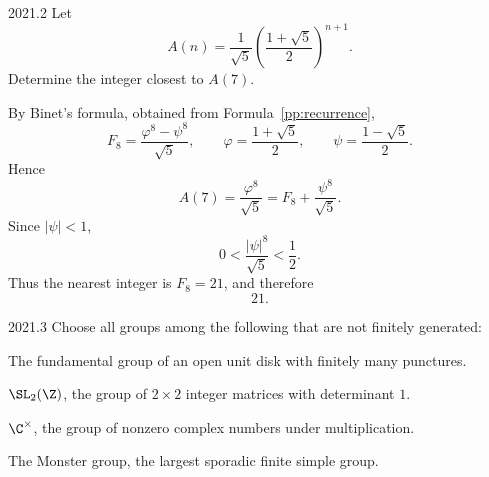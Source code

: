     \begin{pastproblem}{2021.2}
        Let
        \[
            A(n)
            =
            \frac{1}{\sqrt5}
            \left(\frac{1+\sqrt5}{2}\right)^{n+1}.
        \]
        Determine the integer closest to $A(7)$.
    \end{pastproblem}

    \begin{solution}
        By Binet's formula, obtained from Formula~\ref{pp:recurrence},
        \[
            F_8
            =
            \frac{\varphi^8-\psi^8}{\sqrt5},
            \qquad
            \varphi=\frac{1+\sqrt5}{2},
            \qquad
            \psi=\frac{1-\sqrt5}{2}.
        \]
        Hence
        \[
            A(7)=\frac{\varphi^8}{\sqrt5}
            =F_8+\frac{\psi^8}{\sqrt5}.
        \]
        Since $|\psi|<1$,
        \[
            0<\frac{|\psi|^8}{\sqrt5}<\frac12.
        \]
        Thus the nearest integer is $F_8=21$, and therefore
        \[
            \boxed{21}.
        \]
    \end{solution}

    \begin{pastproblem}{2021.3}
        Choose all groups among the following that are not finitely generated:
        \begin{problemchoices}
            \item The fundamental group of an open unit disk with finitely many punctures.
            \item \(\SL_2(\Z)\), the group of \(2\times 2\) integer matrices with determinant \(1\).
            \item \(\C^{\times}\), the group of nonzero complex numbers under multiplication.
            \item The Monster group, the largest sporadic finite simple group.
        \end{problemchoices}
    \end{pastproblem}

